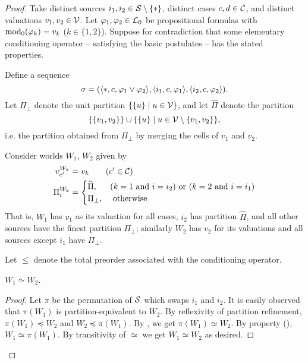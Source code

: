 \begin{proof}
    Take distinct sources $i_1, i_2 \in \S \setminus \{\ast\}$, distinct cases
    $c, d \in \C$, and distinct valuations $v_1, v_2 \in \vals$. Let $\phi_1,
    \phi_2 \in \lprop$ be propositional formulas with $\propmods(\phi_k) = v_k$
    ($k \in \{1, 2\}$). Suppose for contradiction that some elementary
    conditioning operator -- satisfying the basic postulates -- has the stated
    properties.

    Define a sequence
    \[
        \sigma
        = (
            \tuple{\ast, c, \phi_1 \lor \phi_2},
            \tuple{i_1, c, \phi_1},
            \tuple{i_2, c, \phi_2}
        ).
    \]
    Let $\Pi_\bot$ denote the unit partition $\{\{u\} \mid u \in \vals\}$, and
    let $\widehat{\Pi}$ denote the partition
    \[
         \{\{v_1, v_2\}\}
         \cup
         \{\{u\} \mid u \in \vals \setminus \{v_1, v_2\}\},
    \]
    i.e. the partition obtained from $\Pi_\bot$ by merging the cells of $v_1$
    and $v_2$.

    Consider worlds $W_1$, $W_2$ given by
    \begin{align*}
         v^{W_k}_{c'} &= v_k \qquad (c' \in \C) \\
         \Pi^{W_k}_i &= \begin{cases}
            \widehat{\Pi},&
                (k = 1 \text{ and } i = i_2)
                \text { or }
                (k = 2 \text{ and } i = i_1) \\
            \Pi_\bot,& \text{ otherwise }
         \end{cases}
    \end{align*}
    That is, $W_1$ has $v_1$ as its valuation for all cases, $i_2$ has
    partition $\widehat{\Pi}$, and all other sources have the finest partition
    $\Pi_\bot$; similarly $W_2$ has $v_2$ for its valuations and all sources
    except $i_1$ have $\Pi_\bot$.

    Let $\le$ denote the total preorder associated with the conditioning
    operator.

        \begin{claim}
            \label{claim:w1_simeq_w2}
            $W_1 \simeq W_2$.
        \end{claim}
        \begin{proof}
            Let $\pi$ be the permutation of $\S$ which swaps $i_1$ and $i_2$.
            It is easily observed that $\pi(W_1)$ is partition-equivalent to
            $W_2$. By reflexivity of partition refinement, $\pi(W_1) \preceq
            W_2$ and $W_2 \preceq \pi(W_1)$. By , we get $\pi(W_1)
            \simeq W_2$. By property (), $W_1 \simeq
            \pi(W_1)$. By transitivity of ${\simeq}$ we get $W_1 \simeq W_2$ as
            desired.
        \end{proof}


\end{proof}
